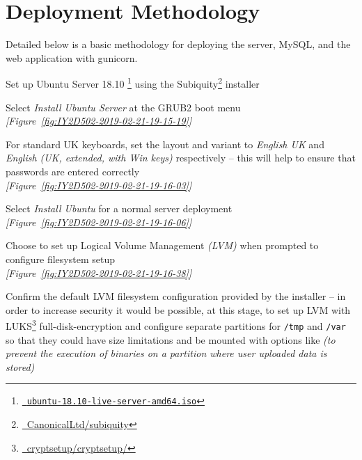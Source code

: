 \section{Deployment Methodology}
Detailed below is a basic methodology for deploying the server, MySQL, and the web application with gunicorn.

\begin{methodology0}
  \item Set up Ubuntu Server 18.10 \footnote{\href{http://releases.ubuntu.com/18.10/ubuntu-18.10-live-server-amd64.iso}{\faUbuntu\ \texttt{ubuntu-18.10-live-server-amd64.iso}}} using the Subiquity\footnote{\href{https://github.com/CanonicalLtd/subiquity}{\faGithub\ CanonicalLtd/subiquity}} installer
    \begin{methodology1}
      \item Select \textit{Install Ubuntu Server} at the GRUB2 boot menu\\
      \textcolor{deep-gray}{\textit{[Figure~\ref{fig:IY2D502-2019-02-21-19-15-19}]}}
      \item For standard UK keyboards, set the layout and variant to \textit{English {UK}} and \textit{English (UK, extended, with Win keys)} respectively -- this will help to ensure that passwords are entered correctly\\
      \textcolor{deep-gray}{\textit{[Figure~\ref{fig:IY2D502-2019-02-21-19-16-03}]}}
      \item Select \textit{Install Ubuntu} for a normal server deployment\\
      \textcolor{deep-gray}{\textit{[Figure~\ref{fig:IY2D502-2019-02-21-19-16-06}]}}
      \item Choose to set up Logical Volume Management \textit{(LVM)} when prompted to configure filesystem setup\\
      \textcolor{deep-gray}{\textit{[Figure~\ref{fig:IY2D502-2019-02-21-19-16-38}]}}
      \item Confirm the default LVM filesystem configuration provided by the installer -- in order to increase security it would be possible, at this stage, to set up LVM with LUKS\footnote{\href{https://gitlab.com/cryptsetup/cryptsetup/}{\faGitlab\ cryptsetup/cryptsetup/}} full-disk-encryption and configure separate partitions for \texttt{/tmp} and \texttt{/var} so that they could have size limitations and be mounted with options like  \textit{(to prevent the execution of binaries on a partition where user uploaded data is stored)}\\

\end{methodology1}
\end{methodology0}
